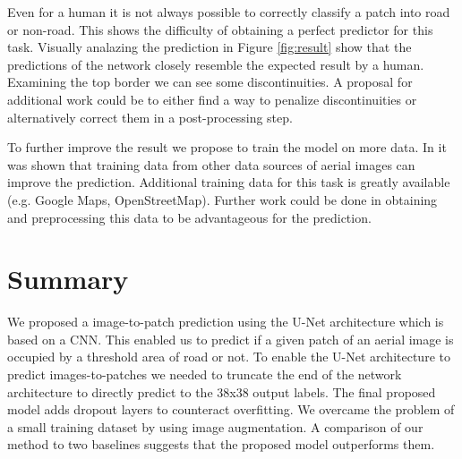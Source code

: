 \documentclass[10pt,conference,compsocconf]{IEEEtran}
\begin{document}
Even for a human it is not always possible to correctly classify a patch into road or non-road. This shows the difficulty of obtaining a perfect predictor for this task. Visually analazing the prediction in Figure \ref{fig:result} show that the predictions of the network closely resemble the expected result by a human. Examining the top border we can see some discontinuities. A proposal for additional work could be to either find a way to penalize discontinuities or alternatively correct them in a post-processing step.

To further improve the result we propose to train the model on more data. In \cite{Kaiser2017} it was shown that training data from other data sources of aerial images can improve the prediction. Additional training data for this task is greatly available (e.g. Google Maps, OpenStreetMap). Further work could be done in obtaining and preprocessing this data to be advantageous for the prediction.

\section{Summary}

We proposed a image-to-patch prediction using the U-Net architecture which is based on a CNN. This enabled us to predict if a given patch of an aerial image is occupied by a threshold area of road or not. To enable the U-Net architecture to predict images-to-patches we needed to truncate the end of the network architecture to directly predict to the 38x38 output labels. The final proposed model adds dropout layers to counteract overfitting. We overcame the problem of a small training dataset by using image augmentation. A comparison of our method to two baselines suggests that the proposed model outperforms them.






\end{document}
